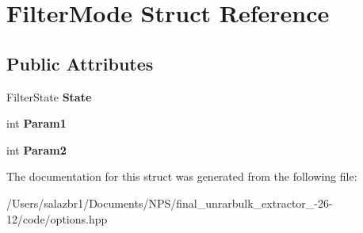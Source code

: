 \hypertarget{struct_filter_mode}{\section{Filter\-Mode Struct Reference}
\label{struct_filter_mode}
}
\subsection*{Public Attributes}
\begin{DoxyCompactItemize}
\item 
\hypertarget{struct_filter_mode_a8d19a744ad89d5f5d381e72066b75336}{Filter\-State {\bfseries State}}\label{struct_filter_mode_a8d19a744ad89d5f5d381e72066b75336}

\item 
\hypertarget{struct_filter_mode_a5e78aea0f97f3a49140bcc9ac94a4e84}{int {\bfseries Param1}}\label{struct_filter_mode_a5e78aea0f97f3a49140bcc9ac94a4e84}

\item 
\hypertarget{struct_filter_mode_ae642d181f77c007488a0e191d6e90f01}{int {\bfseries Param2}}\label{struct_filter_mode_ae642d181f77c007488a0e191d6e90f01}

\end{DoxyCompactItemize}


The documentation for this struct was generated from the following file\-:\begin{DoxyCompactItemize}
\item 
/\-Users/salazbr1/\-Documents/\-N\-P\-S/final\-\_\-unrarbulk\-\_\-extractor\-\_-\/26-\/12/code/options.\-hpp\end{DoxyCompactItemize}
